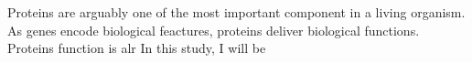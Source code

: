 Proteins are arguably one of the most important component in a living organism. As genes encode biological feactures, proteins deliver biological functions. Proteins function is alr In this study, I will be 